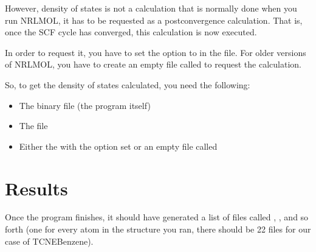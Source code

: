 \documentclass[letterpaper,10pt,english,openany,oneside]{sphinxmanual}
\begin{document}
\begin{sphinxVerbatim}[commandchars=\\\{\}]
                        
                       
                       
                        
                      
                       
                 
\end{sphinxVerbatim}

\sphinxAtStartPar
However, density of states is not a calculation that is normally done when you run NRLMOL, it has to be requested as a post\sphinxhyphen{}convergence calculation. That is, once the SCF cycle has converged, this calculation is now executed.

\sphinxAtStartPar
In order to request it, you have to set the option  to  in the  file. For older versions of NRLMOL, you have to create an empty file called  to request the calculation.

\sphinxAtStartPar
So, to get the density of states calculated, you need the following:
\begin{itemize}
\item {} 
\sphinxAtStartPar
The binary file (the program itself)

\item {} 
\sphinxAtStartPar
The  file

\item {} 
\sphinxAtStartPar
Either the  with the option set or an empty file called 

\end{itemize}


\section{Results}
\label{\detokenize{tutorials/ddos/density_of_states:results}}
\sphinxAtStartPar
Once the program finishes, it should have generated a list of files called , , and so forth (one for every atom in the structure you ran, there should be 22 files for our case of TCNE\sphinxhyphen{}Benzene).
\end{document}
